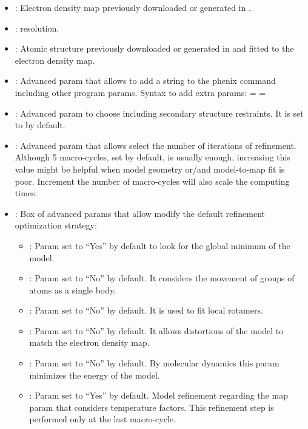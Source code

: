 \begin{itemize}
    \begin{itemize}
     \item {}: Electron density map previously downloaded or generated in \scipion.
     \item {}:  resolution.
     \item {}: Atomic structure previously downloaded or generated in \scipion and fitted to the electron density map.
     \item {}: Advanced param that allows to add a string to the phenix command including other  program params. Syntax to add extra params:  =   = 
     \item {}: Advanced param to choose including secondary structure restraints. It is set to  by default.
     \item {}: Advanced param that allows select the number of iterations of refinement. Although 5 macro-cycles, set by default, is usually enough, increasing this value might be helpful when model geometry or/and model-to-map fit is poor. Increment the number of macro-cycles will also scale the computing times.
     \item {}: Box of advanced params that allow modify the default refinement optimization strategy:
      \begin{itemize}
       \item {}: Param set to ``Yes'' by default to look for the global minimum of the model. 
       \item {}: Param set to ``No'' by default. It considers the movement of groups of atoms as a single body.
       \item {}: Param set to ``No'' by default. It is used to fit local rotamers.
       \item {}: Param set to ``No'' by default. It allows distortions of the model to match the electron density map.
       \item {}: Param set to ``No'' by default. By molecular dynamics this param minimizes the energy of the model.
       \item {}: Param set to ``Yes'' by default. Model refinement regarding the map param that considers temperature factors. This refinement step is performed only at the last macro-cycle.
      \end{itemize}
    \end{itemize}
 

\end{itemize}

